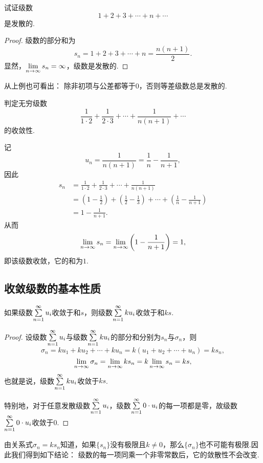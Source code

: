 \begin{example}\label{example:无穷级数.等差级数的收敛性}
试证级数\[
1+2+3+\dotsb+n+\dotsb
\]是发散的.
\begin{proof}
级数的部分和为\[
s_n = 1+2+3+\dotsb+n = \frac{n(n+1)}{2}.
\]显然，\(\lim\limits_{n\to\infty} s_n=\infty\)，级数是发散的.
\end{proof}
\end{example}
从上例也可看出：
{\color{red}除非初项与公差都等于\(0\)，否则等差级数总是发散的.}

\begin{example}
判定无穷级数\[
\frac{1}{1\cdot2}+\frac{1}{2\cdot3}+\dotsb+\frac{1}{n(n+1)}+\dotsb
\]的收敛性.
\begin{solution}
记\[
u_n = \frac{1}{n(n+1)} = \frac{1}{n}-\frac{1}{n+1},
\]因此\begin{align*}
s_n &= \frac{1}{1\cdot2}+\frac{1}{2\cdot3}+\dotsb+\frac{1}{n(n+1)} \\
&= \left(1-\frac{1}{2}\right)+\left(\frac{1}{2}-\frac{1}{3}\right)+\dotsb+\left(\frac{1}{n}-\frac{1}{n+1}\right) \\
&= 1-\frac{1}{n+1}.
\end{align*}从而\[
\lim\limits_{n\to\infty} s_n = \lim\limits_{n\to\infty} \left(1-\frac{1}{n+1}\right) = 1,
\]即该级数收敛，它的和为\(1\).
\end{solution}
\end{example}

\subsection{收敛级数的基本性质}
\begin{property}\label{theorem:无穷级数.收敛级数性质1}
如果级数\(\sum\limits_{n=1}^\infty u_i\)收敛于和\(s\)，则级数\(\sum\limits_{n=1}^\infty k u_i\)收敛于和\(ks\).
\begin{proof}
设级数\(\sum\limits_{n=1}^\infty u_i\)与级数\(\sum\limits_{n=1}^\infty k u_i\)的部分和分别为\(s_n\)与\(\sigma_n\)，则\[
\sigma_n = k u_1 + k u_2 + \dotsb + k u_n = k(u_1 + u_2 + \dotsb + u_n) = k s_n,
\]\[
\lim\limits_{n\to\infty}\sigma_n = \lim\limits_{n\to\infty} k s_n = k \lim\limits_{n\to\infty} s_n = ks,
\]也就是说，级数\(\sum\limits_{n=1}^\infty k u_i\)收敛于\(ks\).

特别地，对于任意发散级数\(\sum\limits_{n=1}^\infty u_i\)，级数\(\sum\limits_{n=1}^\infty 0 \cdot u_i\)的每一项都是零，故级数\(\sum\limits_{n=1}^\infty 0 \cdot u_i\)收敛于\(0\).
\end{proof}
\end{property}

由关系式\(\sigma_n = k s_n\)知道，如果\(\{s_n\}\)没有极限且\(k\neq0\)，那么\(\{\sigma_n\}\)也不可能有极限.因此我们得到如下结论：
{\color{red}级数的每一项同乘一个非零常数后，它的敛散性不会改变.}

